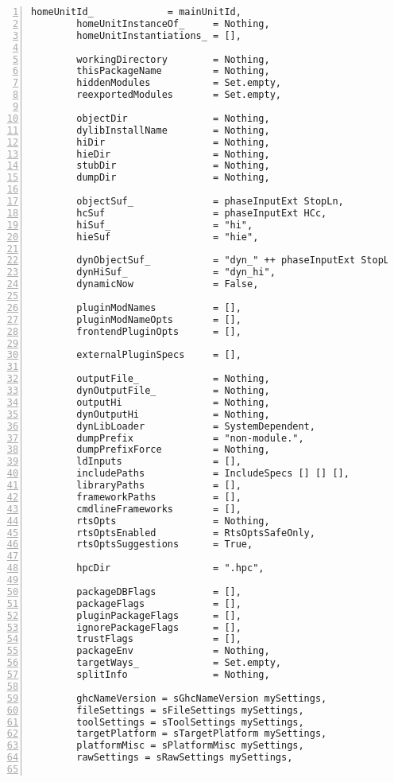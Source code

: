 \documentclass[en]{pracamgr}
\begin{document}
\begin{lstlisting}[numbers=left,stepnumber=1]
        homeUnitId_             = mainUnitId,
        homeUnitInstanceOf_     = Nothing,
        homeUnitInstantiations_ = [],

        workingDirectory        = Nothing,
        thisPackageName         = Nothing,
        hiddenModules           = Set.empty,
        reexportedModules       = Set.empty,

        objectDir               = Nothing,
        dylibInstallName        = Nothing,
        hiDir                   = Nothing,
        hieDir                  = Nothing,
        stubDir                 = Nothing,
        dumpDir                 = Nothing,

        objectSuf_              = phaseInputExt StopLn,
        hcSuf                   = phaseInputExt HCc,
        hiSuf_                  = "hi",
        hieSuf                  = "hie",

        dynObjectSuf_           = "dyn_" ++ phaseInputExt StopLn,
        dynHiSuf_               = "dyn_hi",
        dynamicNow              = False,

        pluginModNames          = [],
        pluginModNameOpts       = [],
        frontendPluginOpts      = [],

        externalPluginSpecs     = [],

        outputFile_             = Nothing,
        dynOutputFile_          = Nothing,
        outputHi                = Nothing,
        dynOutputHi             = Nothing,
        dynLibLoader            = SystemDependent,
        dumpPrefix              = "non-module.",
        dumpPrefixForce         = Nothing,
        ldInputs                = [],
        includePaths            = IncludeSpecs [] [] [],
        libraryPaths            = [],
        frameworkPaths          = [],
        cmdlineFrameworks       = [],
        rtsOpts                 = Nothing,
        rtsOptsEnabled          = RtsOptsSafeOnly,
        rtsOptsSuggestions      = True,

        hpcDir                  = ".hpc",

        packageDBFlags          = [],
        packageFlags            = [],
        pluginPackageFlags      = [],
        ignorePackageFlags      = [],
        trustFlags              = [],
        packageEnv              = Nothing,
        targetWays_             = Set.empty,
        splitInfo               = Nothing,

        ghcNameVersion = sGhcNameVersion mySettings,
        fileSettings = sFileSettings mySettings,
        toolSettings = sToolSettings mySettings,
        targetPlatform = sTargetPlatform mySettings,
        platformMisc = sPlatformMisc mySettings,
        rawSettings = sRawSettings mySettings,


\end{lstlisting}
\end{document}

